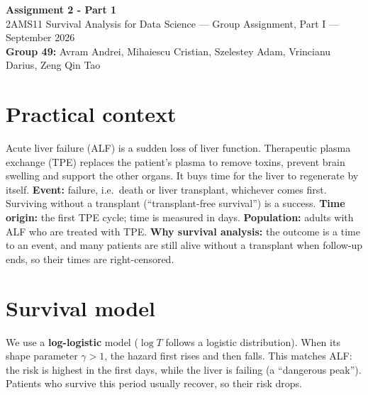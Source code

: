 \documentclass[10pt,a4paper]{article}
\begin{document}
\begin{center}
{\large\bfseries Assignment 2 - Part 1}\\[3pt]
{\small 2AMS11 Survival Analysis for Data Science --- Group Assignment, Part I --- September 2026}\\[1pt]
{\small\textbf{Group 49:} Avram Andrei, Mihaiescu Cristian, Szelestey Adam, Vrincianu Darius, Zeng Qin Tao}
\end{center}
\vspace{-8pt}

\section{Practical context}
Acute liver failure (ALF) is a sudden loss of liver function. Therapeutic plasma exchange (TPE) replaces the patient's plasma to remove toxins, prevent brain swelling and support the other organs. It buys time for the liver to regenerate by itself.
\textbf{Event:} failure, i.e.\ death or liver transplant, whichever comes first. Surviving without a transplant (``transplant-free survival'') is a success.
\textbf{Time origin:} the first TPE cycle; time is measured in days.
\textbf{Population:} adults with ALF who are treated with TPE.
\textbf{Why survival analysis:} the outcome is a time to an event, and many patients are still alive without a transplant when follow-up ends, so their times are right-censored.

\section{Survival model}
We use a \textbf{log-logistic} model ($\log T$ follows a logistic distribution). When its shape parameter $\gamma>1$, the hazard first rises and then falls. This matches ALF: the risk is highest in the first days, while the liver is failing (a ``dangerous peak''). Patients who survive this period usually recover, so their risk drops.
\end{document}

